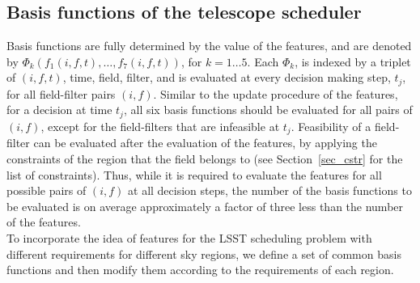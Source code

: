 \documentclass[11pt]{article}
\theoremstyle{definition}
\begin{document}
\subsection{Basis functions of the telescope scheduler}\label{sec_lsst_bfs}
Basis functions are fully determined by the value of the features, and are denoted by $\Phi_k(f_1(i,f,t),\dots, f_7(i,f,t))$, for $k = 1 \dots 5$. Each $\Phi_k$, is indexed by a triplet of $(i,f,t)$, time, field, filter, and is evaluated at every decision making step, $t_j$, for all field-filter pairs $(i,f)$. Similar to the update procedure of the features, for a decision at time $t_j$, all six basis functions should be evaluated for all pairs of $(i,f)$, except for the field-filters that are infeasible at $t_j$. Feasibility of a field-filter can be evaluated after the evaluation of the features, by applying the constraints of the region that the field belongs to (see Section~\ref{sec_cstr} for the list of constraints). Thus, while it is required to evaluate the features for all possible pairs of $(i,f)$ at all decision steps, the number of the basis functions to be evaluated is on average approximately a factor of three less than the number of the features.\\
To incorporate the idea of features for the LSST scheduling problem with different requirements for different sky regions, we define a  set of common basis functions and then modify them according to the requirements of each region. 
\end{document}
